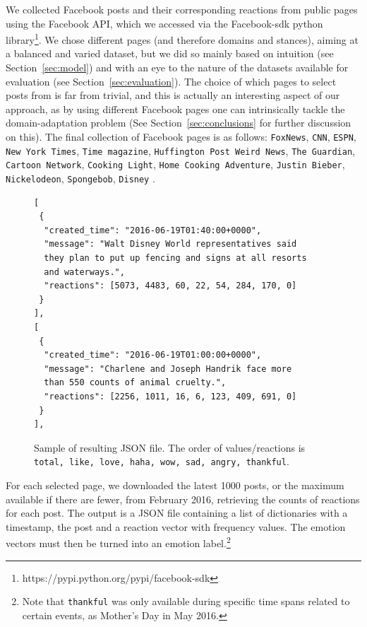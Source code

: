 \documentclass[11pt]{article}
\begin{document}
We collected Facebook posts and their corresponding reactions from public pages using the Facebook API, which we accessed via the Facebook-sdk python library\footnote{https://pypi.python.org/pypi/facebook-sdk}. We chose different pages (and therefore domains and stances), aiming at a balanced and varied dataset, but we did so mainly based on intuition (see Section~\ref{sec:model}) and with an eye to the nature of the datasets available for evaluation (see Section~\ref{sec:evaluation}). The choice of which pages to select posts from is far from trivial, and this is actually an interesting aspect of our approach, as by using different Facebook pages one can intrinsically tackle the domain-adaptation problem (See Section~\ref{sec:conclusions} for further discussion on this). The final collection of Facebook pages is as follows: 
\texttt{FoxNews}, 
\texttt{CNN}, 
\texttt{ESPN}, 
\texttt{New York Times}, 
\texttt{Time magazine},
\texttt{Huffington Post Weird News}, 
\texttt{The Guardian}, 
\texttt{Cartoon Network}, 
\texttt{Cooking Light}, 
\texttt{Home Cooking Adventure}, 
\texttt{Justin Bieber}, 
\texttt{Nickelodeon}, 
\texttt{Spongebob}, 
\texttt{Disney}
.


\begin{figure}
\vspace*{-.8cm}
\begin{Verbatim}[fontsize=\scriptsize]
[
 {
  "created_time": "2016-06-19T01:40:00+0000",
  "message": "Walt Disney World representatives said 
  they plan to put up fencing and signs at all resorts 
  and waterways.",
  "reactions": [5073, 4483, 60, 22, 54, 284, 170, 0]
 }
],
[
 {
  "created_time": "2016-06-19T01:00:00+0000",
  "message": "Charlene and Joseph Handrik face more
  than 550 counts of animal cruelty.",
  "reactions": [2256, 1011, 16, 6, 123, 409, 691, 0]
 }
],
\end{Verbatim}
\vspace*{-.8cm}
\caption{Sample of resulting JSON file\label{fig:json}. The order of values/reactions is \texttt{total, like, love, haha, wow, sad, angry, thankful}.}
\end{figure}


For each selected page, we downloaded the latest 1000 posts, or the maximum available if there are fewer, from February 2016,
retrieving the counts of reactions for each post. The output is a JSON file containing a list of dictionaries with a timestamp, the post and a reaction vector with frequency values. The emotion vectors must then be turned into an emotion label.\footnote{Note that \texttt{thankful} was only available during specific time spans related to certain events, as Mother's Day in May 2016.}
\end{document}
